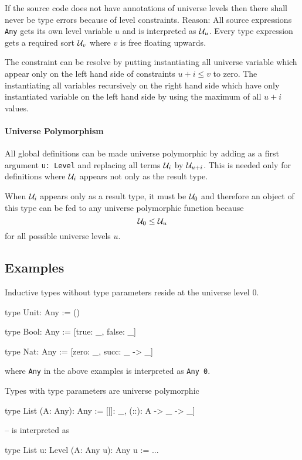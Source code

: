 If the source code does not have annotations of universe levels then there shall
never be type errors because of level constraints. Reason: All source
expressions {\tt Any} gets its own level variable $u$ and is interpreted as
${\mathcal U}_u$. Every type expression gets a required sort ${\mathcal U}_v$  where $v$ is free
floating upwards.

The constraint can be resolve by putting instantiating all universe variable
which appear only on the left hand side of constraints $u + i \le v$ to zero.
The instantiating all variables recursively on the right hand side which have
only instantiated variable on the left hand side by using the maximum of all $u
+ i$ values.

\paragraph{Universe Polymorphism} All global definitions  can be made universe
polymorphic by adding as a first argument {\tt u: Level} and replacing all terms
${\mathcal U}_i$ by ${\mathcal U}_{u + i}$. This is needed only for definitions where ${\mathcal U}_i$
appears not only as the result type.

When ${\mathcal U}_i$ appears only as a result type, it must be ${\mathcal U}_0$ and therefore
an object of this type can be fed to any universe polymorphic function because
$$
    {\mathcal U}_0 \le {\mathcal U}_u
$$
for all possible universe levels $u$.






\subsection{Examples}


Inductive types without type parameters reside at the universe level $0$.

\begin{alba}
    type Unit: Any := ()

    type Bool: Any := [true: _, false: _]

    type Nat:  Any := [zero: _, succ: _ -> _]
\end{alba}
where {\tt Any} in the above examples is interpreted as {\tt Any 0}.

Types with type parameters are universe polymorphic
\begin{alba}
    type List (A: Any): Any := [[]: _, (::): A -> _ -> _]

    -- is interpreted as

    type List {u: Level} (A: Any u): Any u := ...
\end{alba}

